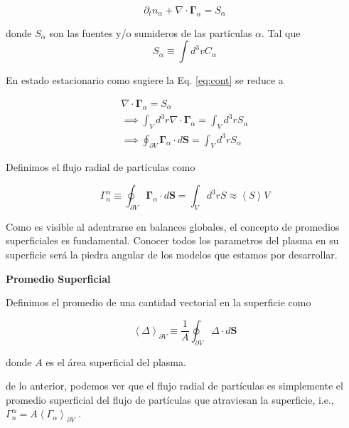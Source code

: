  \begin{equation}\label{eq:cont}
    \partial_t n_\alpha + \nabla\cdot\pmb{\Gamma}_\alpha = S_\alpha
  \end{equation}

  donde $S_\alpha$ son las fuentes y/o sumideros de las part\'iculas $\alpha$. Tal que 
  \begin{equation}
    S_\alpha \equiv \int d^3v C_\alpha
  \end{equation}
  
  En estado estacionario como sugiere \cite{lechte2002} la Eq. \eqref{eq:cont} se reduce a 

  \begin{eqnarray*}
    \nabla\cdot\pmb{\Gamma}_\alpha = S_\alpha \\
    \implies \int_V d^3r\nabla\cdot\pmb{\Gamma}_\alpha = \int_V d^3r S_\alpha\\
    \implies \oint_{\partial V} \pmb{\Gamma}_\alpha\cdot d\textbf{S} = \int_V d^3r S_\alpha
  \end{eqnarray*}

  Definimos el flujo radial de part\'iculas como

  \begin{equation}\label{eq:rtpf}
    \Gamma_n^\alpha \equiv \oint_{\partial V} \pmb{\Gamma}_\alpha \cdot d\textbf{S} = \int_V d^3r S \approx \left<S\right>V
  \end{equation}

  Como es visible al adentrarse en balances globales, el concepto de promedios superficiales es fundamental. Conocer todos los parametros del plasma en su superficie ser\'a la piedra angular de los modelos que estamos por desarrollar.

  \begin{shaded}
    \textbf{Promedio Superficial}

    Definimos el promedio de una cantidad vectorial en la superficie como 

    \begin{equation}\label{eq:supavg}
      \left<\pmb{\varDelta}\right>_{\partial V} \equiv \frac{1}{A}\oint_{\partial V}\pmb{\varDelta}\cdot d\textbf{S}
    \end{equation}

    donde $A$ es el \'area superficial del plasma.
  \end{shaded}

  de lo anterior, podemos ver que el flujo radial de part\'iculas es simplemente el promedio superficial del flujo de part\'iculas que atraviesan la superficie, i.e., $\Gamma_n^\alpha = A\left<\Gamma_\alpha\right>_{\partial V}$ \cite{dinklage2005}.
  
